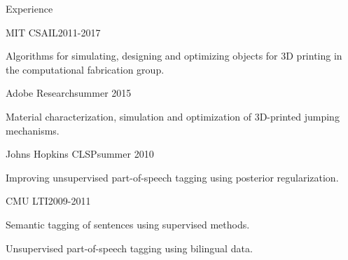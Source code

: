 \documentclass{resume} %
\begin{document}
\begin{rSection}{Experience}

\begin{rSubsection}{MIT CSAIL}{2011-2017}{}{}
\item Algorithms for simulating, designing and optimizing objects for 3D printing
in the computational fabrication group.
\end{rSubsection}



\begin{rSubsection}{Adobe Research}{summer 2015}{}{}
\item Material characterization, simulation and optimization of 3D-printed jumping mechanisms.
\end{rSubsection}

\begin{rSubsection}{Johns Hopkins CLSP}{summer 2010}{}{}
\item Improving unsupervised part-of-speech tagging using posterior regularization.
\end{rSubsection}

\begin{rSubsection}{CMU LTI}{2009-2011}{}{}
\item Semantic tagging of sentences using supervised methods.
\item Unsupervised part-of-speech tagging using bilingual data.
\end{rSubsection}

\end{rSection}
\end{document}
